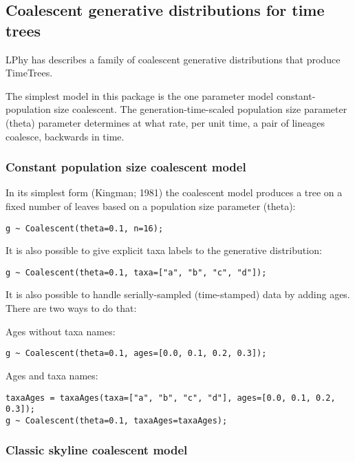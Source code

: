 \documentclass[oneside]{article}
\begin{document}
\subsection{Coalescent generative distributions for time trees}

LPhy has describes a family of coalescent generative distributions
that produce TimeTrees.

The simplest model in this package is the one parameter model
constant-population size coalescent.
The generation-time-scaled population size parameter (theta) parameter determines at
what rate, per unit time, a pair of lineages coalesce, backwards in time.

\subsubsection{Constant population size coalescent model}

In its simplest form (Kingman; 1981) the coalescent model produces a
tree on a fixed number of leaves based on a population size parameter (theta):

\begin{verbatim}
g ~ Coalescent(theta=0.1, n=16);
\end{verbatim}

It is also possible to give explicit taxa labels to the generative
distribution: 

\begin{verbatim}
g ~ Coalescent(theta=0.1, taxa=["a", "b", "c", "d"]);
\end{verbatim}

It is also possible to handle serially-sampled (time-stamped) data by
adding ages.
There are two ways to do that: 

Ages without taxa names:

\begin{verbatim}
g ~ Coalescent(theta=0.1, ages=[0.0, 0.1, 0.2, 0.3]);
\end{verbatim}

Ages and taxa names:

\begin{verbatim}
taxaAges = taxaAges(taxa=["a", "b", "c", "d"], ages=[0.0, 0.1, 0.2,
0.3]);
g ~ Coalescent(theta=0.1, taxaAges=taxaAges);
\end{verbatim}

\subsubsection{Classic skyline coalescent model}
\end{document}
